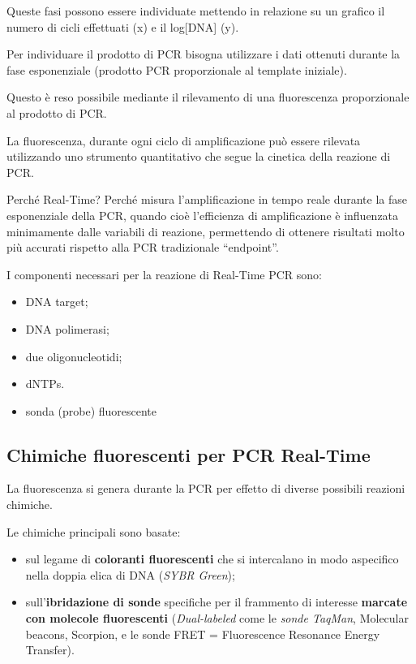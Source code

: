 \documentclass[11pt]{book}
\begin{document}
Queste fasi possono essere individuate mettendo in relazione su un
grafico il numero di cicli effettuati (x) e il log{[}DNA{]} (y).

Per individuare il prodotto di PCR bisogna utilizzare i dati ottenuti
durante la fase esponenziale (prodotto PCR proporzionale al template
iniziale).

Questo è reso possibile mediante il rilevamento di una fluorescenza
proporzionale al prodotto di PCR.

La fluorescenza, durante ogni ciclo di amplificazione può essere
rilevata utilizzando uno strumento quantitativo che segue la cinetica
della reazione di PCR.

Perché Real-Time? Perché misura l'amplificazione in tempo reale durante
la fase esponenziale della PCR, quando cioè l'efficienza di
amplificazione è influenzata minimamente dalle variabili di reazione,
permettendo di ottenere risultati molto più accurati rispetto alla PCR
tradizionale ``endpoint''.

I componenti necessari per la reazione di Real-Time PCR sono:

\begin{itemize}
\itemsep1pt\parskip0pt
\item
  DNA target;
\item
  DNA polimerasi;
\item
  due oligonucleotidi;
\item
  dNTPs.
\item
  sonda (probe) fluorescente
\end{itemize}

\subsection{Chimiche fluorescenti per PCR
Real-Time}\label{chimiche-fluorescenti-per-pcr-real-time}

La fluorescenza si genera durante la PCR per effetto di diverse
possibili reazioni chimiche.

Le chimiche principali sono basate:

\begin{itemize}
\itemsep1pt\parskip0pt
\item
  sul legame di \textbf{coloranti fluorescenti} che si intercalano in
  modo aspecifico nella doppia elica di DNA (\emph{SYBR Green});
\item
  sull'\textbf{ibridazione di sonde} specifiche per il frammento di
  interesse \textbf{marcate con molecole fluorescenti}
  (\emph{Dual-labeled} come le \emph{sonde TaqMan}, Molecular beacons,
  Scorpion, e le sonde FRET = Fluorescence Resonance Energy Transfer).
\end{itemize}
\end{document}
